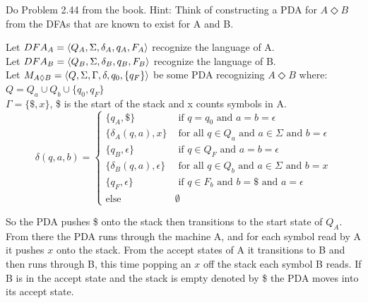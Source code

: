 \begin{problem}{8}
\end{problem}

\begin{problem}{9}
  Do Problem 2.44 from the book. Hint: Think of constructing a PDA for $A \Diamond B$ from the DFAs that are known to exist for A
  and B.
  \begin{solution}
    Let $DFA_A = \left \langle Q_A, \Sigma, \delta_A, q_A, F_A \right \rangle $ recognize the language of A. \\
    Let $DFA_B = \left \langle Q_B, \Sigma, \delta_B, q_B, F_B \right \rangle $ recognize the language of B. \\
    Let $M_{A \Diamond B} = \left \langle Q, \Sigma, \Gamma, \delta, q_0, \{ q_F \} \right \rangle $ be some PDA recognizing $A \Diamond B$ where:
    \br
    $Q = Q_a \cup Q_b \cup \{ q_0, q_F \}$ \\
    $\Gamma = \{ \$, x \}$, \$ is the start of the stack and x counts symbols in A.
    \br
    \[
      \delta(q, a, b) =
      \begin{cases}
        \{ q_A, \$ \} &\text{ if } q = q_0 \text{ and } a = b = \epsilon \\
        \{ \delta_A(q, a), x\} &\text{ for all } q \in Q_a \text{ and } a \in \Sigma \text{ and } b = \epsilon \\
        \{ q_B, \epsilon \} &\text{ if } q \in Q_F \text{ and } a = b = \epsilon \\
        \{ \delta_B(q, a), \epsilon \} &\text{ for all } q \in Q_b \text{ and } a \in \Sigma \text{ and } b = x \\
        \{ q_F, \epsilon \} &\text{ if } q \in F_b \text{ and } b = \$ \text{ and } a = \epsilon \\
        \text{else } &\emptyset
      \end{cases}
    \]

  \end{solution}
    So the PDA pushes \$ onto the stack then transitions to the start state of $Q_A$. From there the PDA runs through
    the machine A, and for each symbol read by A it pushes $x$ onto the stack. From the accept states of A it
    transitions to B and then runs through B, this time popping an $x$ off the stack each symbol B reads. If B is in the
    accept state and the stack is empty denoted by \$ the PDA moves into its accept state.
\end{problem}


